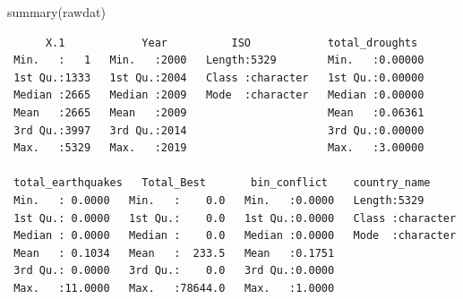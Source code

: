 \documentclass[
  letterpaper,
  DIV=11,
  numbers=noendperiod]{scrartcl}
\newenvironment{Shaded}{\begin{snugshade}}{\end{snugshade}}
\newcommand{\FunctionTok}[1]{\textcolor[rgb]{0.28,0.35,0.67}{#1}}
\newcommand{\NormalTok}[1]{\textcolor[rgb]{0.00,0.23,0.31}{#1}}
\begin{document}
\begin{Shaded}
\begin{Highlighting}[]
\FunctionTok{summary}\NormalTok{(rawdat)}
\end{Highlighting}
\end{Shaded}

\begin{verbatim}
      X.1            Year          ISO            total_droughts   
 Min.   :   1   Min.   :2000   Length:5329        Min.   :0.00000  
 1st Qu.:1333   1st Qu.:2004   Class :character   1st Qu.:0.00000  
 Median :2665   Median :2009   Mode  :character   Median :0.00000  
 Mean   :2665   Mean   :2009                      Mean   :0.06361  
 3rd Qu.:3997   3rd Qu.:2014                      3rd Qu.:0.00000  
 Max.   :5329   Max.   :2019                      Max.   :3.00000  
                                                                   
 total_earthquakes   Total_Best       bin_conflict    country_name      
 Min.   : 0.0000   Min.   :    0.0   Min.   :0.0000   Length:5329       
 1st Qu.: 0.0000   1st Qu.:    0.0   1st Qu.:0.0000   Class :character  
 Median : 0.0000   Median :    0.0   Median :0.0000   Mode  :character  
 Mean   : 0.1034   Mean   :  233.5   Mean   :0.1751                     
 3rd Qu.: 0.0000   3rd Qu.:    0.0   3rd Qu.:0.0000                     
 Max.   :11.0000   Max.   :78644.0   Max.   :1.0000                     
                                                                        

\end{verbatim}
\end{document}
